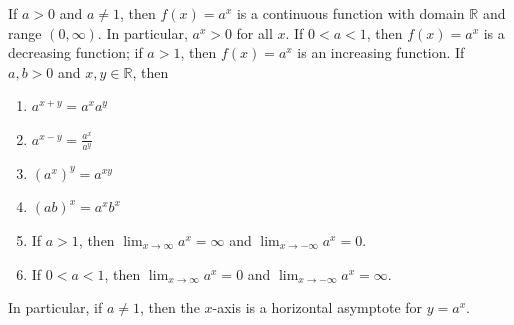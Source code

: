 \begin{frame}
\begin{theorem}
If $a > 0$ and $a \neq 1$, then $f(x) = a^x$ is a continuous function with domain $\mathbb{R}$ and range $(0,\infty )$.  In particular, $a^x > 0$ for all $x$.  If $0 < a < 1$, then $f(x) = a^x$ is a decreasing function; if $a > 1$, then $f(x) = a^x$ is an increasing function.  If $a, b > 0$ and $x, y \in\mathbb{R}$, then
\begin{enumerate}
\item  $a^{x+y} = a^xa^y$
\item  $a^{x-y} = \frac{a^x}{a^y}$
\item  $(a^x)^y = a^{xy}$
\item  $(ab)^x = a^xb^x$
\item  If $a > 1$, then $\lim_{x\rightarrow \infty} a^x = \infty$ and $\lim_{x\rightarrow -\infty} a^x = 0$.
\item  If $0 < a < 1$, then $\lim_{x\rightarrow \infty} a^x = 0$ and $\lim_{x\rightarrow -\infty} a^x = \infty$.
\end{enumerate}
In particular, if $a \neq 1$, then the $x$-axis is a horizontal asymptote for $y = a^x$. 
\end{theorem}
\end{frame}
